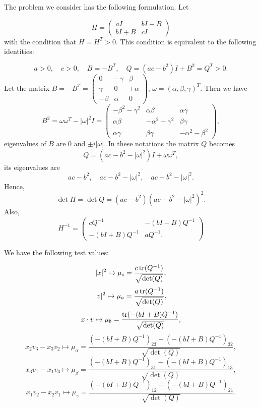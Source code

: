 
The problem we consider has the following formulation. Let

\[
    H = \begin{pmatrix}
        aI&bI-B\\bI+B&cI
    \end{pmatrix}
\]
with the condition that $H=H^T>0$. This condition is equivalent to the following identities:

\[
    a>0,\quad c>0,\quad B=-B^T,\quad Q=(ac-b^2)I+B^2=Q^T>0.
\]
Let the matrix $B=-B^T = \begin{pmatrix}
    0& -\gamma&  \beta\\
     \gamma&0&+\alpha\\
    -\beta& \alpha&0
\end{pmatrix}$, $\omega = (\alpha,\beta,\gamma)^T$.
Then we have
\[
    B^2
    =\omega \omega^T-|\omega|^2I
    = \begin{pmatrix}
    -\beta^2- \gamma^2& \alpha \beta& \alpha \gamma\\
    \alpha \beta& -\alpha^2- \gamma^2&\beta\gamma\\
    \alpha \gamma&\beta\gamma& -\alpha^2- \beta^2
    \end{pmatrix},
\]
eigenvalues of $B$ are $0$  and $\pm i|\omega|$. %
In these notations the matrix $Q$ becomes
\[
    Q=(ac-b^2-|\omega|^2)I+\omega \omega^T ,
\]
its eigenvalues are 
\[
    ac-b^2,\quad ac-b^2-|\omega|^2,\quad ac-b^2-|\omega|^2.
\]
Hence,
\[
    \det H =\det Q
    =(ac-b^2)(ac-b^2-|\omega|^2)^2.
\]
Also,
\[
    H^{-1}=\begin{pmatrix}
        cQ^{-1}&-(bI-B)Q^{-1}\\-(bI+B)Q^{-1}&aQ^{-1} .
    \end{pmatrix}
\]


We have the  following test values:

\[
    |x|^2\mapsto  \mu_c=\frac{c\operatorname{tr} (Q^{-1}) }{ \sqrt {\det(Q)}},
\]
\[
    |v|^2\mapsto  \mu_a = \frac{a\operatorname{tr} (Q^{-1}) }{ \sqrt {\det(Q)}},
\]
\[
    x\cdot v\mapsto  \mu_b=\frac{ \operatorname{tr} (-(bI+B)Q^{-1}) }{ \sqrt {\det(Q)}},
\]
\[
    x_2 v_3 - x_3 v_2\mapsto \mu_{\alpha} =\frac{   (-(bI+B)Q^{-1})_{23} -(-(bI+B)Q^{-1})_{32}  }{ \sqrt {\det(Q)}},
\]
\[
    x_3 v_1 - x_1 v_3\mapsto \mu_{\beta} =\frac{   (-(bI+B)Q^{-1})_{31} -(-(bI+B)Q^{-1})_{13}  }{ \sqrt {\det(Q)}},
\]
\[
    x_1 v_2 - x_2 v_1\mapsto \mu_{\gamma} =\frac{   (-(bI+B)Q^{-1})_{12} -(-(bI+B)Q^{-1})_{21}  }{ \sqrt {\det(Q)}}.
\]

